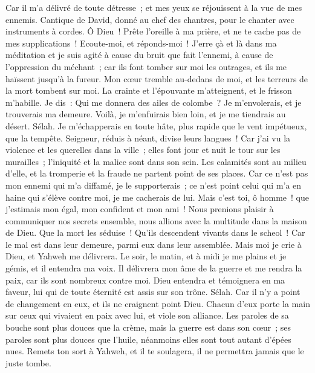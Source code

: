 \begin{multicols}{2}
Car il m'a délivré de toute détresse~; et mes yeux se réjouissent à la vue de mes ennemis.
\VerseOne{}Cantique de David, donné au chef des chantres, pour le chanter avec instruments à cordes.
Ô Dieu~! Prête l'oreille à ma prière, et ne te cache pas de mes supplications~!
Ecoute-moi, et réponds-moi~! J'erre çà et là dans ma méditation et je suis agité
à cause du bruit que fait l'ennemi, à cause de l'oppression du méchant~; car ils font tomber sur moi les outrages, et ils me haïssent jusqu'à la fureur.
Mon cœur tremble au-dedans de moi, et les terreurs de la mort tombent sur moi.
La crainte et l'épouvante m'atteignent, et le frisson m'habille.
Je dis~: Qui me donnera des ailes de colombe~? Je m'envolerais, et je trouverais ma demeure.
Voilà, je m'enfuirais bien loin, et je me tiendrais au désert. Sélah.
Je m'échapperais en toute hâte, plus rapide que le vent impétueux, que la tempête.
Seigneur, réduis à néant, divise leurs langues~! Car j'ai vu la violence et les querelles dans la ville~;
elles font jour et nuit le tour sur les murailles~; l'iniquité et la malice sont dans son sein.
Les calamités sont au milieu d'elle, et la tromperie et la fraude ne partent point de ses places.
Car ce n'est pas mon ennemi qui m'a diffamé, je le supporterais~; ce n'est point celui qui m'a en haine qui s'élève contre moi, je me cacherais de lui.
Mais c'est toi, ô homme~! que j'estimais mon égal, mon confident et mon ami~!
Nous prenions plaisir à communiquer nos secrets ensemble, nous allions avec la multitude dans la maison de Dieu.
Que la mort les séduise~! Qu'ils descendent vivants dans le scheol~! Car le mal est dans leur demeure, parmi eux dans leur assemblée.
Mais moi je crie à Dieu, et Yahweh me délivrera.
Le soir, le matin, et à midi je me plains et je gémis, et il entendra ma voix.
Il délivrera mon âme de la guerre et me rendra la paix, car ils sont nombreux contre moi.
Dieu entendra et témoignera en ma faveur, lui qui de toute éternité est assis sur son trône. Sélah. Car il n'y a point de changement en eux, et ils ne craignent point Dieu.
Chacun d'eux porte la main sur ceux qui vivaient en paix avec lui, et viole son alliance.
Les paroles de sa bouche sont plus douces que la crème, mais la guerre est dans son cœur~; ses paroles sont plus douces que l'huile, néanmoins elles sont tout autant d'épées nues.
Remets ton sort à Yahweh, et il te soulagera, il ne permettra jamais que le juste tombe.

\end{multicols}
